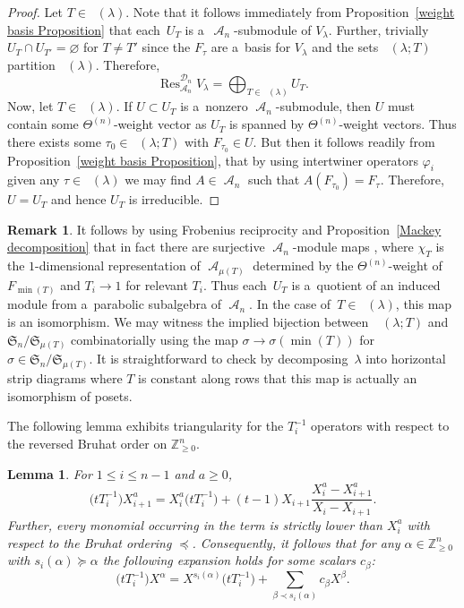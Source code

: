 \documentclass[pdftex]{sigma}
\numberwithin{equation}{section}
\newtheorem{Lemma}[Theorem]{Lemma}
\theoremstyle{definition}
\newtheorem{Remark}[Theorem]{Remark}
\DeclareMathOperator{\RYT}{\mathrm{RYT}_{\geq 0}}
\DeclareMathOperator{\PSYT}{\mathrm{PSYT}_{\geq 0}}
\DeclareMathOperator{\RSSYT}{\mathrm{RSSYT}_{\geq 0}}
\DeclareMathOperator{\sA}{\mathscr{A}}
\DeclareMathOperator{\sD}{\mathscr{D}}
\DeclareMathOperator{\Ind}{Ind}
\DeclareMathOperator{\Res}{Res}
\DeclareMathOperator{\Min}{\mathrm{min}}
\begin{document}
\begin{proof}
 Let $T \in \RYT(\lambda)$. Note that it follows immediately from Proposition~\ref{weight basis Proposition} that each~$U_T$ is a~$\sA_n$-submodule of $V_{\lambda}$. Further, trivially $U_T \cap U_{T'} = \varnothing$ for $T \neq T'$ since the $F_{\tau}$ are a~basis for $V_{\lambda}$ and the sets $\PSYT(\lambda;T)$ partition $\PSYT(\lambda)$. Therefore,
 \[
 \Res^{\sD_n}_{\sA_n} V_{\lambda} = \bigoplus_{T \in \RYT(\lambda)} U_T.
 \]
 Now, let $T \in \RYT(\lambda)$. If $U \subset U_{T}$ is a~nonzero $\sA_n$-submodule, then $U$ must contain some $\Theta^{(n)}$-weight vector as $U_T$ is spanned by $\Theta^{(n)}$-weight vectors. Thus there exists some ${\tau_0 \!\in\! \PSYT(\lambda;T)}$ with $F_{\tau_0} \in U$. But then it follows readily from Proposition~\ref{weight basis Proposition}, that by using intertwiner operators $\varphi_i$ given any $\tau \in \PSYT(\lambda)$ we may find $A \in \sA_n$ such that $A(F_{\tau_0}) = F_{\tau}$. Therefore, $U = U_T$ and hence $U_T$ is irreducible.
\end{proof}

\begin{Remark}\label{PSYT orbits using Bruhat}
 It follows by using Frobenius reciprocity and Proposition~\ref{Mackey decomposition} that in fact there are surjective $\sA_n$-module maps
\smash{$ \Ind_{\sA_{\mu(T)}}^{\sA_n} \chi_T \rightarrow U_T$},
 where $\chi_T$ is the $1$-dimensional representation of $\sA_{\mu(T)}$ determined by the $\Theta^{(n)}$-weight of $F_{\Min(T)}$ and $T_i \rightarrow 1$ for relevant $T_i$. Thus each~$U_T$ is a~quotient of an induced module from a~parabolic subalgebra of $\sA_n$. In the case of~${T \in \RSSYT(\lambda)}$, this map is an isomorphism. We may witness the implied bijection between~${\PSYT(\lambda;T)}$ and $\mathfrak{S}_n/\mathfrak{S}_{\mu(T)}$ combinatorially using the map $\sigma \rightarrow \sigma(\Min(T))$
 for~${\sigma \in \mathfrak{S}_n/\mathfrak{S}_{\mu(T)}}$. It is straightforward to check by decomposing~$\lambda$ into horizontal strip diagrams where $T$ is constant along rows that this map is actually an isomorphism of posets.
\end{Remark}

The following lemma exhibits triangularity for the $T_i^{-1}$ operators with respect to the reversed Bruhat order on $\mathbb{Z}_{\geq 0}^{n}$.

\begin{Lemma}\label{action of T inverse}
 For $1\leq i \leq n-1$ and $a \geq 0$,
 \[
 \bigl(tT_i^{-1}\bigr)X_{i+1}^{a} = X_i^{a}\bigl(tT_i^{-1}\bigr) + (t-1)X_{i+1}\frac{X_i^{a}-X_{i+1}^{a}}{X_i-X_{i+1}}.
 \]
 Further, every monomial occurring in the term  is strictly lower than $X_i^{a}$ with respect to the Bruhat ordering $\preceq$. Consequently, it follows that for any $\alpha \in \mathbb{Z}^n_{\geq 0}$ with $s_i(\alpha) \succeq \alpha$ the following expansion holds for some scalars $c_{\beta}$:
 \[
 \bigl(tT_i^{-1}\bigr)X^{\alpha} = X^{s_i(\alpha)}\bigl(tT_i^{-1}\bigr) + \sum_{\beta \prec s_i(\alpha)} c_{\beta}X^{\beta}.
 \]
\end{Lemma}
\end{document}
